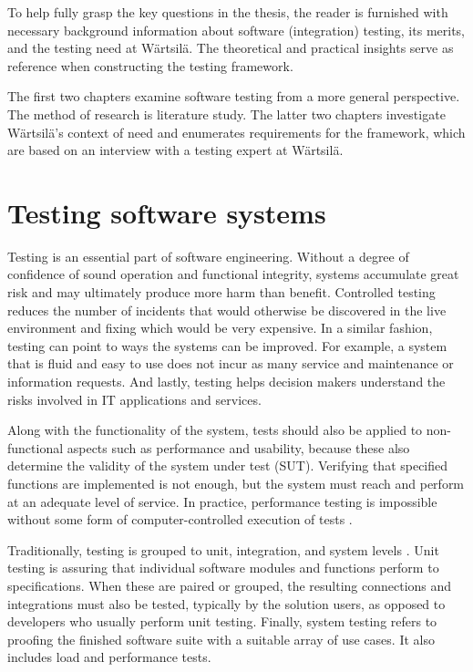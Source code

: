 \documentclass[12pt,a4paper,oneside,pdftex]{report}
\begin{document}

To help fully grasp the key questions in the thesis, the reader is furnished with necessary background information about software (integration) testing, its merits, and the testing need at Wärtsilä. The theoretical and practical insights serve as reference when constructing the testing framework. 

The first two chapters examine software testing from a more general perspective. The method of research is literature study. The latter two chapters investigate Wärtsilä's context of need and enumerates requirements for the framework, which are based on an interview with a testing expert at Wärtsilä.

\section{Testing software systems}

Testing is an essential part of software engineering. Without a degree of confidence of sound operation and functional integrity, systems accumulate great risk and may ultimately produce more harm than benefit. Controlled testing reduces the number of incidents that would otherwise be discovered in the live environment and fixing which would be very expensive. \citep{jenkins2008software, liu2009unified} In a similar fashion, testing can point to ways the systems can be improved. For example, a system that is fluid and easy to use does not incur as many service and maintenance or information requests. And lastly, testing helps decision makers understand the risks involved in IT applications and services.

Along with the functionality of the system, tests should also be applied to non-functional aspects such as performance and usability, because these also determine the validity of the system under test (SUT). Verifying that specified functions are implemented is not enough, but the system must reach and perform at an adequate level of service. In practice, performance testing is impossible without some form of computer-controlled execution of tests \citep{laukkanen2006data}.

Traditionally, testing is grouped to unit, integration, and system levels \citep{jenkins2008software, burnstein2003practical}. Unit testing is assuring that individual software modules and functions perform to specifications. When these are paired or grouped, the resulting connections and integrations must also be tested, typically by the solution users, as opposed to developers who usually perform unit testing. Finally, system testing refers to proofing the finished software suite with a suitable array of use cases. It also includes load and performance tests. \citep{rehman2007testing}
\end{document}
